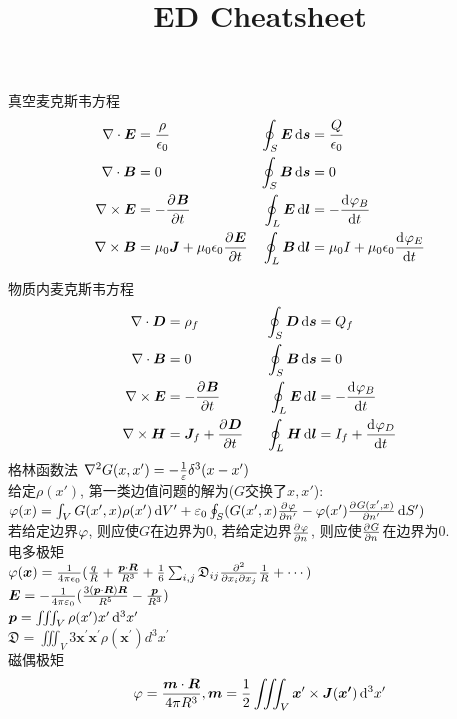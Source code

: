 \documentclass[UTF8,8pt]{ctexart}
\title{ED Cheatsheet}
\begin{document}
 
\leftmargini=5mm
\raggedright
\footnotesize
\begin{multicols}{3}
    真空麦克斯韦方程 
    $$\begin{aligned} 
        \nabla\cdot\bm{E} &=  \frac{\rho}{\epsilon_0}& \oint_S\bm{E}\mathop{}\!\mathrm{d} \bm{s} &=  \frac{Q}{\epsilon_0}\\
        \nabla\cdot\bm{B} &=  0&\oint_S\bm{B}\mathop{}\!\mathrm{d} \bm{s} &=  0\\
        \nabla\times\bm{E} &=  -\frac{\partial^{} \bm{B}}{\partial t^{}}& \oint_L\bm{E}\mathop{}\!\mathrm{d} \bm{l} &=  -\frac{\mathrm{d}^{} \varphi_B}{\mathrm{d} t^{}}\\
        \nabla\times\bm{B} &=  \mu_0\bm{J}+\mu_0\epsilon_0 \frac{\partial^{} \bm{E}}{\partial t^{}}& \oint_L\bm{B}\mathop{}\!\mathrm{d} \bm{l} &=  \mu_0I+\mu_0\epsilon_0\frac{\mathrm{d}^{} \varphi_E}{\mathrm{d} t^{}}
     \end{aligned}$$
    
    物质内麦克斯韦方程
    $$\begin{aligned} 
        \nabla\cdot\bm{D} &=  \rho_f& \oint_S\bm{D}\mathop{}\!\mathrm{d} \bm{s} &=  Q_f\\
        \nabla\cdot\bm{B} &=  0& \oint_S\bm{B}\mathop{}\!\mathrm{d} \bm{s} &=  0\\
        \nabla\times\bm{E} &=  -\frac{\partial^{} \bm{B}}{\partial t^{}}&\quad \oint_L\bm{E}\mathop{}\!\mathrm{d} \bm{l} &=  -\frac{\mathrm{d}^{} \varphi_B}{\mathrm{d} t^{}}\\
        \nabla\times\bm{H} &=  \bm{J}_f+\frac{\partial^{} \bm{D}}{\partial t^{}}& \oint_L\bm{H}\mathop{}\!\mathrm{d} \bm{l} &=  I_f+\frac{\mathrm{d}^{} \varphi_D}{\mathrm{d} t^{}}
     \end{aligned}$$
    格林函数法
    $\nabla^2G(x,x')=-\frac{1}{\varepsilon}\delta^3(x-x')$\\
    给定$\rho(x')$, 第一类边值问题的解为($G$交换了$x,x'$):\\
    $\varphi(x)=\int_VG(x',x)\rho(x')\mathop{}\!\mathrm{d} V'+\varepsilon_0\oint_S(G(x',x)\frac{\partial^{} \varphi}{\partial {n'}^{}}-\varphi(x')\frac{\partial^{} G(x',x)}{\partial {n'}^{}}\mathop{}\!\mathrm{d} S')$\\
    若给定边界$\varphi$, 则应使$G$在边界为0, 若给定边界$\frac{\partial^{} \varphi}{\partial {n}^{}}$, 则应使$\frac{\partial^{} G}{\partial {n}^{}}$在边界为0.\\
    电多极矩\\
    $\varphi(\bm{x})=\frac{1}{4 \pi \epsilon_{0}}(\frac{q}{R}+\frac{\bm{p}\cdot\bm{R}}{R^3} + \frac{1}{6} \sum_{i, j} \mathfrak{D}_{i j} \frac{\partial^{2}}{\partial x_{i} \partial x_{j}} \frac{1}{R}+\cdots)$\\
    $\bm{E}=-\frac{1}{4\pi\varepsilon_0}(\frac{3(\bm{p}\cdot\bm{R})\bm{R}}{R^5}-\frac{\bm{p}}{R^3})$\\
    $\bm{p}=\iiint_V\rho(x')x'\mathop{}\!\mathrm{d}^3x'$\\
    $\mathfrak{D}=\iiint_{V} 3 \bm{x}^{\prime} \bm{x}^{\prime} \rho(\bm{x}^{\prime}) d^{3} x^{\prime}$\\
    磁偶极矩
    $$\varphi = \frac{\bm{m}\cdot\bm{R}}{4\pi R^3}, \bm{m}=\frac{1}{2}\iiint_V\bm{x}'\times \bm{J}(\bm{x'})\mathop{}\!\mathrm{d}^3x'$$


\end{multicols}
\end{document}
